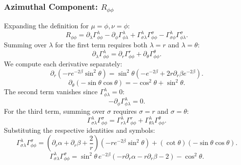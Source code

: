 \documentclass[11pt, a4paper]{report}
\begin{document}
\subsubsection{Azimuthal Component: $R_{\phi\phi}$}
Expanding the definition for $\mu=\phi, \nu=\phi$:
\begin{equation}
R_{\phi\phi} = \partial_\lambda \Gamma^\lambda_{\phi\phi} - \partial_\phi \Gamma^\lambda_{\phi\lambda} + \Gamma^\lambda_{\sigma\lambda} \Gamma^\sigma_{\phi\phi} - \Gamma^\lambda_{\sigma\phi} \Gamma^\sigma_{\phi\lambda}.
\end{equation}
Summing over $\lambda$ for the first term requires both $\lambda=r$ and $\lambda=\theta$:
\begin{equation}
\partial_\lambda \Gamma^\lambda_{\phi\phi} = \partial_r \Gamma^r_{\phi\phi} + \partial_\theta \Gamma^\theta_{\phi\phi}.
\end{equation}
We compute each derivative separately:
\begin{equation}
\partial_r \left( -re^{-2\beta}\sin^2\theta \right) = \sin^2\theta \left( -e^{-2\beta} + 2r\partial_r\beta e^{-2\beta} \right).
\end{equation}
\begin{equation}
\partial_\theta \left( -\sin\theta\cos\theta \right) = -\cos^2\theta + \sin^2\theta.
\end{equation}
The second term vanishes since $\Gamma^\lambda_{\phi\lambda} = 0$:
\begin{equation}
-\partial_\phi \Gamma^\lambda_{\phi\lambda} = 0.
\end{equation}
For the third term, summing over $\sigma$ requires $\sigma=r$ and $\sigma=\theta$:
\begin{equation}
\Gamma^\lambda_{\sigma\lambda} \Gamma^\sigma_{\phi\phi} = \Gamma^\lambda_{r\lambda} \Gamma^r_{\phi\phi} + \Gamma^\lambda_{\theta\lambda} \Gamma^\theta_{\phi\phi}.
\end{equation}
Substituting the respective identities and symbols:
\begin{equation}
\Gamma^\lambda_{\sigma\lambda} \Gamma^\sigma_{\phi\phi} = \left( \partial_r\alpha + \partial_r\beta + \frac{2}{r} \right) \left( -re^{-2\beta}\sin^2\theta \right) + (\cot\theta) \left( -\sin\theta\cos\theta \right).
\end{equation}
\begin{equation}
\Gamma^\lambda_{\sigma\lambda} \Gamma^\sigma_{\phi\phi} = \sin^2\theta \, e^{-2\beta} \left( -r\partial_r\alpha - r\partial_r\beta - 2 \right) - \cos^2\theta.
\end{equation}
\end{document}
